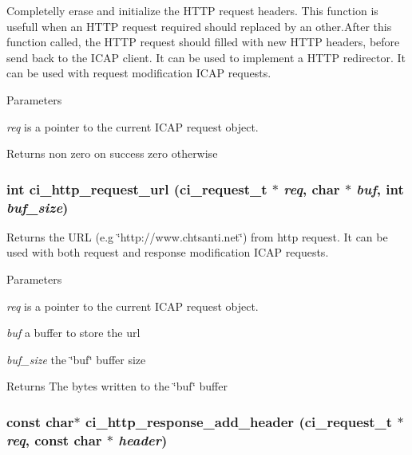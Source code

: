 Completelly erase and initialize the HTTP request headers. This function is usefull when an HTTP request required should replaced by an other.After this function called, the HTTP request should filled with new HTTP headers, before send back to the ICAP client. It can be used to implement a HTTP redirector. It can be used with request modification ICAP requests. 
\begin{DoxyParams}{Parameters}
\item[{\em req}]is a pointer to the current ICAP request object. \end{DoxyParams}
\begin{DoxyReturn}{Returns}
non zero on success zero otherwise 
\end{DoxyReturn}
\hypertarget{group__HTTP_gac1081e7bbfaa5ac736621a0a17cd703c}{
\subsubsection[{ci\_\-http\_\-request\_\-url}]{\setlength{\rightskip}{0pt plus 5cm}int ci\_\-http\_\-request\_\-url ({\bf ci\_\-request\_\-t} $\ast$ {\em req}, \/  char $\ast$ {\em buf}, \/  int {\em buf\_\-size})}}
\label{group__HTTP_gac1081e7bbfaa5ac736621a0a17cd703c}


Returns the URL (e.g \char`\"{}http://www.chtsanti.net\char`\"{}) from http request. It can be used with both request and response modification ICAP requests. 
\begin{DoxyParams}{Parameters}
\item[{\em req}]is a pointer to the current ICAP request object. \item[{\em buf}]a buffer to store the url \item[{\em buf\_\-size}]the \char`\"{}buf\char`\"{} buffer size \end{DoxyParams}
\begin{DoxyReturn}{Returns}
The bytes written to the \char`\"{}buf\char`\"{} buffer 
\end{DoxyReturn}
\hypertarget{group__HTTP_ga9e70a82a932d48d33da3e9e8487c0d6b}{
\subsubsection[{ci\_\-http\_\-response\_\-add\_\-header}]{\setlength{\rightskip}{0pt plus 5cm}const char$\ast$ ci\_\-http\_\-response\_\-add\_\-header ({\bf ci\_\-request\_\-t} $\ast$ {\em req}, \/  const char $\ast$ {\em header})}}
\label{group__HTTP_ga9e70a82a932d48d33da3e9e8487c0d6b}



